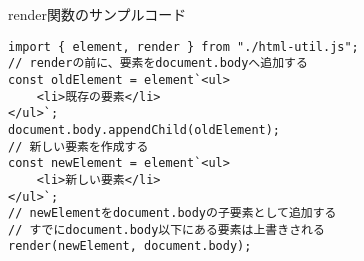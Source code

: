 \begin{listtitle}
render関数のサンプルコード
\end{listtitle}
\begin{lstlisting}
import { element, render } from "./html-util.js";
// renderの前に、要素をdocument.bodyへ追加する
const oldElement = element`<ul>
    <li>既存の要素</li>
</ul>`;
document.body.appendChild(oldElement);
// 新しい要素を作成する
const newElement = element`<ul>
    <li>新しい要素</li>
</ul>`;
// newElementをdocument.bodyの子要素として追加する
// すでにdocument.body以下にある要素は上書きされる
render(newElement, document.body);
\end{lstlisting}
\listend
